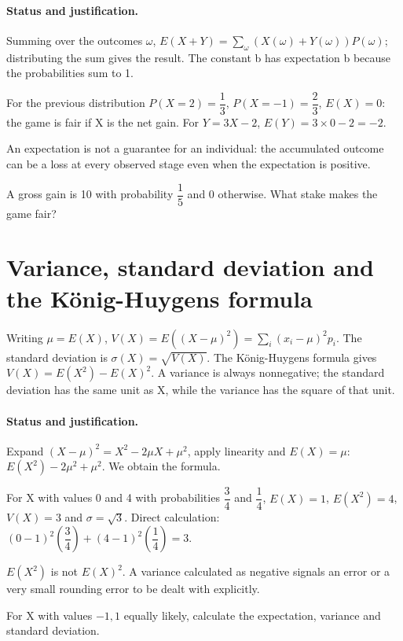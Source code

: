 \paragraph{Status and justification.} Summing over the outcomes $\omega$, $E(X+Y)=\sum_\omega(X(\omega)+Y(\omega))P(\omega)$; distributing the sum gives the result. The constant b has expectation b because the probabilities sum to 1.
\begin{example}For the previous distribution $P(X=2)=\dfrac{1}{3}$, $P(X=-1)=\dfrac{2}{3}$, $E(X)=0$: the game is fair if X is the net gain. For $Y=3X-2$, $E(Y)=3\times0-2=-2$.\end{example}\label{C08-EX2}
\begin{pitfall}An expectation is not a guarantee for an individual: the accumulated outcome can be a loss at every observed stage even when the expectation is positive.\end{pitfall}
\begin{application}A gross gain is 10 with probability $\dfrac{1}{5}$ and 0 otherwise. What stake makes the game fair?\end{application}\label{C08-AP2}
\section{Variance, standard deviation and the König-Huygens formula}\label{C08-U3}
\begin{keypoint}
Writing $\mu=E(X)$, $V(X)=E((X-\mu)^2)=\sum_i(x_i-\mu)^2p_i$. The standard deviation is $\sigma(X)=\sqrt{V(X)}$. The König-Huygens formula gives $V(X)=E(X^2)-E(X)^2$. A variance is always nonnegative; the standard deviation has the same unit as X, while the variance has the square of that unit.
\end{keypoint}
\paragraph{Status and justification.} Expand $(X-\mu)^2=X^2-2\mu X+\mu^2$, apply linearity and $E(X)=\mu$: $E(X^2)-2\mu^2+\mu^2$. We obtain the formula.
\begin{example}For X with values 0 and 4 with probabilities $\dfrac{3}{4}$ and $\dfrac{1}{4}$, $E(X)=1$, $E(X^2)=4$, $V(X)=3$ and $\sigma=\sqrt3$. Direct calculation: $(0-1)^2(\dfrac{3}{4})+(4-1)^2(\dfrac{1}{4})=3$.\end{example}\label{C08-EX3}
\begin{pitfall}$E(X^2)$ is not $E(X)^2$. A variance calculated as negative signals an error or a very small rounding error to be dealt with explicitly.\end{pitfall}
\begin{application}For X with values $-1,1$ equally likely, calculate the expectation, variance and standard deviation.\end{application}\label{C08-AP3}
